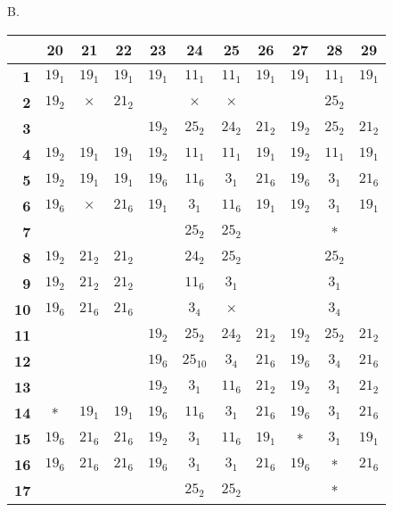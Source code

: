 \documentclass[oneside]{article}
\begin{document}
\begin{center}
B.\
\begin{tabular}{|r|c|c|c|c|c|c|c|c|c|c|} \hline
           &20    &21      &22    &23    &24        &25       &26     &27    &28    &29     \\ \hline
\textbf{1} &$19_1$&$19_1$  &$19_1$&$19_1$&$11_1$    &$11_1$   &$19_1$ &$19_1$&$11_1$&$19_1$ \\ \hline
\textbf{2} &$19_2$&$\times$&$21_2$&      &$\times$  &$\times$ &       &      &$25_2$&       \\ \hline
\textbf{3} &      &        &      &$19_2$&$25_2$    &$24_2$   &$21_2$ &$19_2$&$25_2$&$21_2$ \\ \hline
\textbf{4} &$19_2$&$19_1$  &$19_1$&$19_2$&$11_1$    &$11_1$   &$19_1$ &$19_2$&$11_1$&$19_1$ \\ \hline
\textbf{5} &$19_2$&$19_1$  &$19_1$&$19_6$&$11_6$    &$3_1$    &$21_6$ &$19_6$&$3_1$ &$21_6$ \\ \hline
\textbf{6} &$19_6$&$\times$&$21_6$&$19_1$&$3_1$     &$11_6$   &$19_1$ &$19_2$&$3_1$ &$19_1$ \\ \hline
\textbf{7} &      &        &      &      &$25_2$    &$25_2$   &       &      &*     &       \\ \hline
\textbf{8} &$19_2$&$21_2$  &$21_2$&      &$24_2$    &$25_2$   &       &      &$25_2$&       \\ \hline
\textbf{9} &$19_2$&$21_2$  &$21_2$&      &$11_6$    &$3_1$    &       &      &$3_1$ &       \\ \hline
\textbf{10}&$19_6$&$21_6$  &$21_6$&      &$3_4$     &$\times$ &       &      &$3_4$ &       \\ \hline
\textbf{11}&      &        &      &$19_2$&$25_2$    &$24_2$   &$21_2$ &$19_2$&$25_2$&$21_2$ \\ \hline
\textbf{12}&      &        &      &$19_6$&$25_{10}$ &$3_4$    &$21_6$ &$19_6$&$3_4$ &$21_6$ \\ \hline
\textbf{13}&      &        &      &$19_2$&$3_1$     &$11_6$   &$21_2$ &$19_2$&$3_1$ &$21_2$ \\ \hline
\textbf{14}&*     &$19_1$  &$19_1$&$19_6$&$11_6$    &$3_1$    &$21_6$ &$19_6$&$3_1$ &$21_6$ \\ \hline
\textbf{15}&$19_6$&$21_6$  &$21_6$&$19_2$&$3_1$     &$11_6$   &$19_1$ &*     &$3_1$ &$19_1$ \\ \hline
\textbf{16}&$19_6$&$21_6$  &$21_6$&$19_6$&$3_1$     &$3_1$    &$21_6$ &$19_6$&*     &$21_6$ \\ \hline
\textbf{17}&      &        &      &      &$25_2$    &$25_2$   &       &      &*     &       \\ \hline

\end{tabular}
\end{center}
\end{document}
